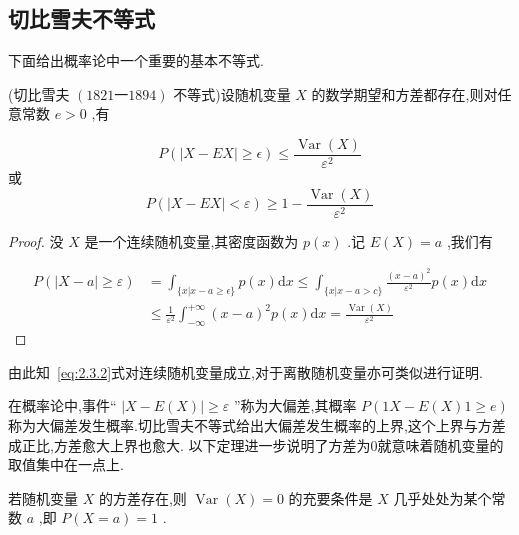 \subsection{切比雪夫不等式}

下面给出概率论中一个重要的基本不等式.

\begin{theorem}{}{}
	(切比雪夫 $ (1821一1894) $ 不等式)设随机变量 $ X $ 的数学期望和方差都存在,则对任意常数 $ e>0 $ ,有
	
	\begin{equation}
	P(|X-E X| \geqslant \epsilon) \leqslant \frac{\operatorname{Var}(X)}{\varepsilon^{2}} \label{eq:2.3.2}
	\end{equation}
	或
	\begin{equation}
	P(|X-E X|<\varepsilon) \geqslant 1-\frac{\operatorname{Var}(X)}{\varepsilon^{2}} \label{eq:2.3.3}
	\end{equation}
\end{theorem}

\begin{proof}
	没 $ X $ 是一个连续随机变量,其密度函数为 $ p(x) $ .记 $ E(X)=a $ ,我们有
	
	\[
	\begin{array}{ll}
	{P(|X-a| \geqslant \varepsilon)} & {=\int_{\{x | x-a \geq \epsilon\}} p(x) \mathrm{d} x \leq \int_{\{x | x-a>c\}} \frac{(x-a)^{2}}{\varepsilon^{2}} p(x) \mathrm{d} x} \\ 
	{} & {\leqslant \frac{1}{\varepsilon^{2}} \int_{-\infty}^{+\infty}(x-a)^{2} p(x) \mathrm{d} x=\frac{\operatorname{Var}(X)}{\varepsilon^{2}}}
	\end{array}
	\] 
\end{proof}

由此知~\ref{eq:2.3.2}式对连续随机变量成立,对于离散随机变量亦可类似进行证明.

在概率论中,事件“ $ |X-E(X)| \geqslant \varepsilon $ ”称为大偏差,其概率 $ P(1X-E(X)1 \geqslant e) $ 称为大偏差发生概率.切比雪夫不等式给出大偏差发生概率的上界,这个上界与方差成正比,方差愈大上界也愈大.
以下定理进一步说明了方差为0就意味着随机变量的取值集中在一点上.

\begin{theorem}{}{}
	若随机变量 $ X $ 的方差存在,则 $ \operatorname{Var}(X)=0 $ 的充要条件是 $ X $ 几乎处处为某个常数 $ a $ ,即 $ P(X=a)=1 $ .
\end{theorem}

